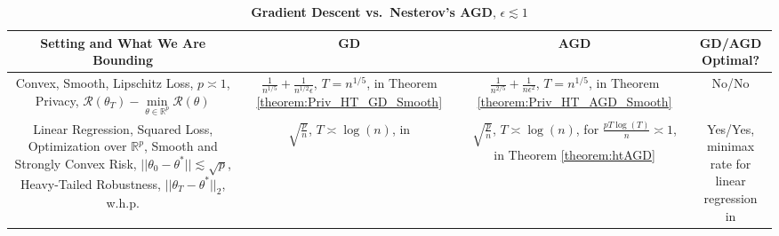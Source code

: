 \documentclass{article}
\begin{document}
\begin{table}[!htbp]
    \centering
    \small  %
    \setlength{\tabcolsep}{4pt}  %
    \renewcommand{\arraystretch}{1.2} %
    \begin{tabular}{|c|c|c|c|}
        \hline
        \textbf{Setting and What We Are Bounding} & \textbf{GD} & \textbf{AGD} & \textbf{GD/AGD Optimal?} \\
        \hline
        \makecell{Convex, Smooth, Lipschitz Loss, $p \asymp 1$, \\ Privacy, $\mathcal{R}(\theta_T) - \mathop{\min}\limits_{\theta \in \mathbb{R}^p}\mathcal{R}(\theta)$} & 
        \makecell{\\$\frac{1}{n^{1/5}} + \frac{1}{n^{1/2}\epsilon}$, \\ \\ $T = n^{1/5}$, \\ in Theorem \ref{theorem:Priv_HT_GD_Smooth}} & 
        \makecell{\\$\frac{1}{n^{2/5}} + \frac{1}{n\epsilon^2}$, \\ \\ $T = n^{1/5}$, \\ in Theorem \ref{theorem:Priv_HT_AGD_Smooth}} &
        No/No \\
        \hline
        \makecell{Linear Regression, Squared Loss, \\ Optimization over $\mathbb{R}^p$, \\ Smooth and Strongly Convex Risk, \\ $||\theta_0 - \theta^*|| \lesssim \sqrt{p}$, Heavy-Tailed \\ Robustness, $||\theta_T - \theta^*||_2$, w.h.p.} & 
        \makecell{$\sqrt{\frac{p}{n}}$, \\ \\ $T \asymp \log(n)$, \\ in \cite{RE}} & 
        \makecell{\\$\sqrt{\frac{p}{n}}$, \\ \\ $T \asymp \log(n)$, \\ for $\frac{pT\log(T)}{n} \asymp 1$, \\ in Theorem \ref{theorem:htAGD}} & \makecell{Yes/Yes,\\  minimax rate for \\ linear regression \\ in \cite{Stats_Info_Duchi}} \\
        \hline
    \end{tabular}
    \caption{\textbf{Gradient Descent vs.\ Nesterov's AGD}, $\epsilon \lesssim 1$}
    \label{tab2}
\end{table}
\end{document}
